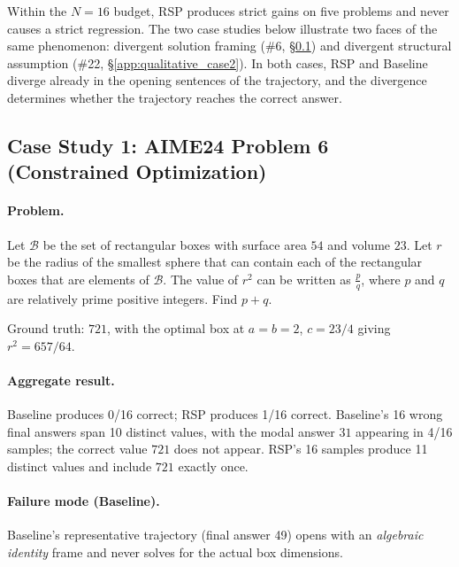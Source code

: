 Within the $N{=}16$ budget, RSP produces strict gains on five problems and never causes a strict regression. The two case studies below illustrate two faces of the same phenomenon: divergent solution framing (\#6, \S\ref{app:qualitative_case1}) and divergent structural assumption (\#22, \S\ref{app:qualitative_case2}). In both cases, RSP and Baseline diverge already in the opening sentences of the trajectory, and the divergence determines whether the trajectory reaches the correct answer.

\subsection{Case Study 1: AIME24 Problem 6 (Constrained Optimization)}\label{app:qualitative_case1}

\paragraph{Problem.}
\begin{tcolorbox}[colback=gray!5, colframe=black!60, arc=3pt, boxrule=0.5pt, fontupper=\footnotesize, breakable]
Let $\mathcal{B}$ be the set of rectangular boxes with surface area $54$ and volume $23$. Let $r$ be the radius of the smallest sphere that can contain each of the rectangular boxes that are elements of $\mathcal{B}$. The value of $r^2$ can be written as $\frac{p}{q}$, where $p$ and $q$ are relatively prime positive integers. Find $p+q$.
\end{tcolorbox}
Ground truth: $\boxed{721}$, with the optimal box at $a = b = 2$, $c = 23/4$ giving $r^2 = 657/64$.

\paragraph{Aggregate result.} Baseline produces 0/16 correct; RSP produces 1/16 correct. Baseline's 16 wrong final answers span 10 distinct values, with the modal answer $31$ appearing in 4/16 samples; the correct value $721$ does not appear. RSP's 16 samples produce 11 distinct values and include $721$ exactly once.

\paragraph{Failure mode (Baseline).} Baseline's representative trajectory (final answer 49) opens with an \emph{algebraic identity} frame and never solves for the actual box dimensions.

